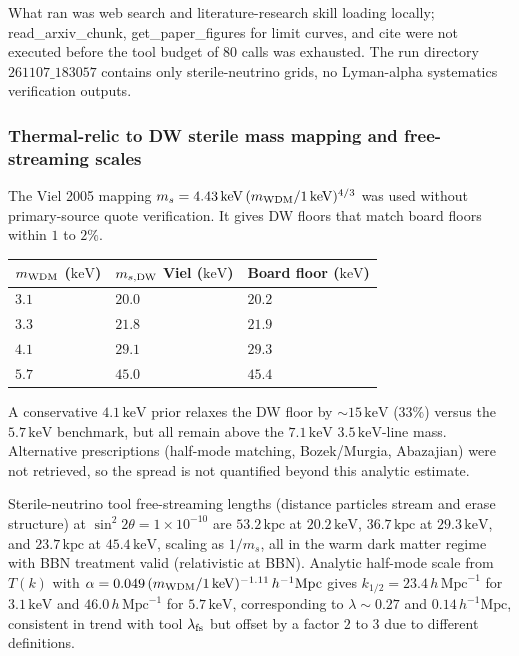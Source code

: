 \documentclass[11pt,a4paper]{article}
\begin{document}
What ran was web search and literature-research skill loading locally; read\_arxiv\_chunk, get\_paper\_figures for limit curves, and cite were not executed before the tool budget of $80$ calls was exhausted. The run directory $261107\_183057$ contains only sterile-neutrino grids, no Lyman-alpha systematics verification outputs.

\subsubsection{Thermal-relic to DW sterile mass mapping and free-streaming scales}
The Viel 2005 mapping $m_s = 4.43\,\mathrm{keV}\,(m_{\rm WDM}/1\,\mathrm{keV})^{4/3}$ was used without primary-source quote verification. It gives DW floors that match board floors within $1$ to $2\%$.

\begin{longtable}{@{}p{}p{}p{}@{}}
\toprule
\textbf{$m_{\rm WDM}$ ($\mathrm{keV}$)} & \textbf{$m_{s,{\rm DW}}$ Viel ($\mathrm{keV}$)} & \textbf{Board floor ($\mathrm{keV}$)} \\ \midrule \endhead
$3.1$ & $20.0$ & $20.2$ \\
$3.3$ & $21.8$ & $21.9$ \\
$4.1$ & $29.1$ & $29.3$ \\
$5.7$ & $45.0$ & $45.4$ \\
\bottomrule\end{longtable}
A conservative $4.1\,\mathrm{keV}$ prior relaxes the DW floor by $\sim 15\,\mathrm{keV}$ ($33\%$) versus the $5.7\,\mathrm{keV}$ benchmark, but all remain above the $7.1\,\mathrm{keV}$ $3.5\,\mathrm{keV}$-line mass. Alternative prescriptions (half-mode matching, Bozek/Murgia, Abazajian) were not retrieved, so the spread is not quantified beyond this analytic estimate.

Sterile-neutrino tool free-streaming lengths (distance particles stream and erase structure) at $\sin^2 2\theta = 1\times10^{-10}$ are $53.2\,\mathrm{kpc}$ at $20.2\,\mathrm{keV}$, $36.7\,\mathrm{kpc}$ at $29.3\,\mathrm{keV}$, and $23.7\,\mathrm{kpc}$ at $45.4\,\mathrm{keV}$, scaling as $1/m_s$, all in the warm dark matter regime with BBN treatment valid (relativistic at BBN). Analytic half-mode scale from $T(k)$ with $\alpha = 0.049\,(m_{\rm WDM}/1\,\mathrm{keV})^{-1.11}\,h^{-1}\mathrm{Mpc}$ gives $k_{1/2} = 23.4\,h\,\mathrm{Mpc}^{-1}$ for $3.1\,\mathrm{keV}$ and $46.0\,h\,\mathrm{Mpc}^{-1}$ for $5.7\,\mathrm{keV}$, corresponding to $\lambda \sim 0.27$ and $0.14\,h^{-1}\mathrm{Mpc}$, consistent in trend with tool $\lambda_{\rm fs}$ but offset by a factor $2$ to $3$ due to different definitions.
\end{document}
